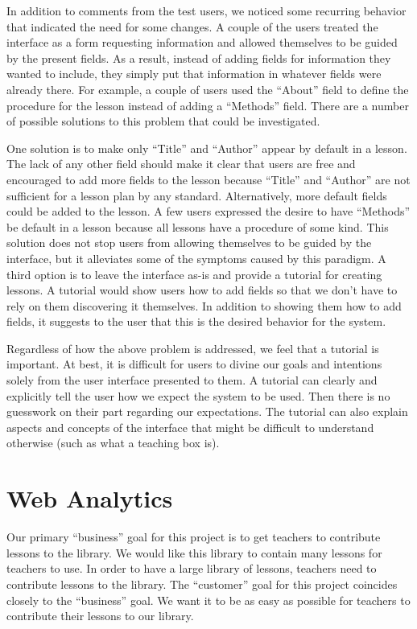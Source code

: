 \documentclass[10pt,letter]{article}
\begin{document}
In addition to comments from the test users, we noticed some recurring behavior
that indicated the need for some changes. A couple of the users treated the
interface as a form requesting information and allowed themselves to be guided
by the present fields. As a result, instead of adding fields for information
they wanted to include, they simply put that information in whatever fields were
already there. For example, a couple of users used the ``About'' field to define
the procedure for the lesson instead of adding a ``Methods'' field. There are a
number of possible solutions to this problem that could be investigated.

One solution is to make only ``Title'' and ``Author'' appear by default in a
lesson.  The lack of any other field should make it clear that users are free
and encouraged to add more fields to the lesson because ``Title'' and ``Author''
are not sufficient for a lesson plan by any standard. Alternatively, more
default fields could be added to the lesson. A few users expressed the desire to
have ``Methods'' be default in a lesson because all lessons have a procedure of
some kind. This solution does not stop users from allowing themselves to be
guided by the interface, but it alleviates some of the symptoms caused by this
paradigm. A third option is to leave the interface as-is and provide a tutorial
for creating lessons. A tutorial would show users how to add fields so that we
don't have to rely on them discovering it themselves. In addition to showing
them how to add fields, it suggests to the user that this is the desired
behavior for the system.

Regardless of how the above problem is addressed, we feel that a tutorial is
important. At best, it is difficult for users to divine our goals and intentions
solely from the user interface presented to them. A tutorial can clearly and
explicitly tell the user how we expect the system to be used. Then there is no
guesswork on their part regarding our expectations. The tutorial can also
explain aspects and concepts of the interface that might be difficult to
understand otherwise (such as what a teaching box is).

\section{Web Analytics}
Our primary ``business'' goal for this project is to get teachers to contribute
lessons to the library. We would like this library to contain many lessons for
teachers to use. In order to have a large library of lessons, teachers need to
contribute lessons to the library. The ``customer'' goal for this project
coincides closely to the ``business'' goal. We want it to be as easy as possible
for teachers to contribute their lessons to our library.
\end{document}
